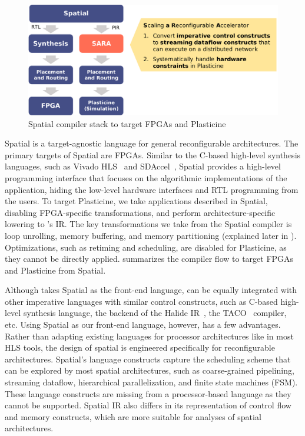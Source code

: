 \begin{figure}
\centering
\includegraphics[width=1\textwidth]{figs/spatialstack.pdf}
\caption[Spatial compiler stack to target FPGAs and Plasticine]{
  Spatial compiler stack to target FPGAs and Plasticine
}
\label{fig:spatialstack}
\end{figure}

Spatial is a target-agnostic language for general reconfigurable architectures. 
The primary targets of Spatial are FPGAs.
Similar to the C-based high-level synthesis languages, such as Vivado HLS~\cite{vivado} and
SDAccel~\cite{sdaccel},
Spatial provides a high-level programming interface that focuses on the algorithmic 
implementations of the application, hiding the low-level hardware interfaces and RTL programming from the
users.
To target Plasticine, we take applications described in Spatial, disabling FPGA-specific
transformations, and perform architecture-specific lowering to \name's IR.
The key transformations we take from the Spatial compiler is loop unrolling, memory buffering, and
memory partitioning
(explained later in ).
Optimizations, such as retiming and scheduling, are disabled for Plasticine, as they cannot be
directly applied.
 summarizes the compiler flow to target FPGAs and Plasticine from Spatial.

Although \name takes Spatial as the front-end language, \name can be equally
integrated with other imperative languages with similar control constructs, such as C-based high-level
synthesis language, the backend of the Halide IR~\cite{halide}, the TACO~\cite{taco} compiler, etc.
Using Spatial as our front-end language, however, has a few advantages.
Rather than adapting existing languages for processor architectures like in most HLS tools, 
the design of spatial is engineered specifically for reconfigurable architectures.
Spatial's language constructs capture the scheduling scheme that can be explored by most
spatial architectures, such as coarse-grained pipelining, streaming dataflow, hierarchical parallelization, 
and finite state machines (FSM).
These language constructs are missing from a processor-based language as they cannot be supported.
Spatial IR also differs in its representation of control flow and memory constructs, which are more suitable for analyses of spatial architectures.

